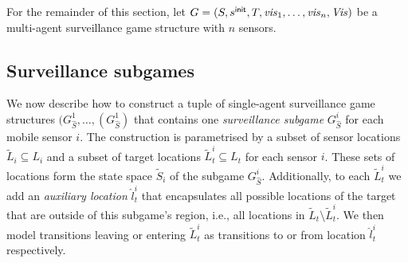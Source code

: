 For the remainder of this section, let $G = (S,s^{\mathsf{init}},T,\mathit{vis}_1,\ldots,\mathit{vis}_n,\mathit{Vis})$ be a multi-agent surveillance game structure with $n$ sensors.
\subsection{Surveillance subgames}
We now describe how to construct a tuple of single-agent surveillance game structures $(G^{1}_{\hat{S}},\ldots,(G^{1}_{\hat{S}})$ that contains one  \emph{surveillance subgame} $G^{i}_{\hat{S}}$ for each mobile sensor  $i$. The construction is parametrised by a subset of sensor locations $\widetilde{L}_i \subseteq L_i$ and a subset of target locations $\widetilde{L}^i_t \subseteq L_t$ for each sensor $i$. These sets of locations form the state space $\widetilde{S}_i$ of the subgame $G^{i}_{\hat{S}}$.
Additionally, to each $\widetilde{L}^i_t$ we add an \emph{auxiliary location} $\hat{l}^i_t$ that encapsulates all possible locations of the target that are outside of this subgame's region, i.e., all locations in $\widetilde{L}_t \setminus \widetilde{L}^i_t$.  We then model transitions leaving or entering $\widetilde{L}^i_t$ as transitions to or from location $\hat{l}^i_t$ respectively.

